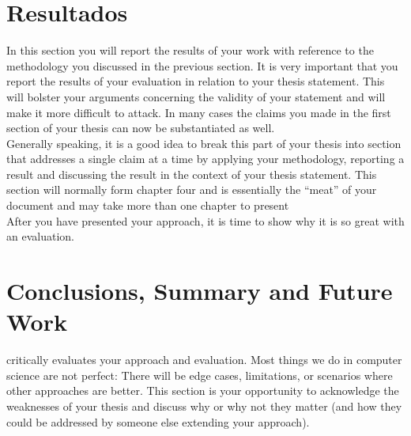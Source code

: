 \documentclass[11pt,a4paper,oldfontcommands]{memoir}
\begin{document}
\begin{multicols}{2}
\section{Resultados}
In this section you will report the results of your work with reference to the methodology
you discussed in the previous section. It is very important that you report the results of
your evaluation in relation to your thesis statement. This will bolster your arguments
concerning the validity of your statement and will make it more difficult to attack. In
many cases the claims you made in the first section of your thesis can now be
substantiated as well.
\\

Generally speaking, it is a good idea to break this part of your thesis into section that
addresses a single claim at a time by applying your methodology, reporting a result and
discussing the result in the context of your thesis statement.
This section will normally form chapter four and is essentially the “meat” of your
document and may take more than one chapter to present
\\

After you have presented your approach, it is time to show why it is so great with an evaluation.
\section{Conclusions, Summary and Future Work}
critically evaluates your approach and evaluation. Most things we
do in computer science are not perfect: There will be edge cases, limitations, or scenarios where other approaches are better. This section is your opportunity to acknowledge the weaknesses of your thesis and discuss why or why not they matter (and how they could be addressed by someone else extending your approach).\\



% 


\end{multicols}
\end{document}
